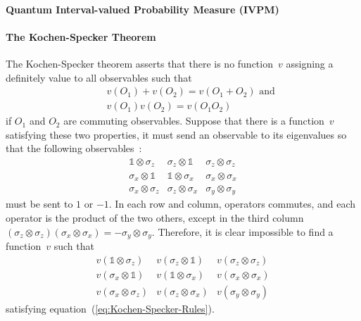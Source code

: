 \documentclass[reprint, aps, prl,superscriptaddress, showpacs,
showkeys]{revtex4-1}
\theoremstyle{plain}
\theoremstyle{definition}
\begin{document}
\paragraph{Quantum Interval-valued Probability Measure (IVPM)}

\paragraph{The Kochen-Specker Theorem}

The Kochen-Specker theorem asserts that there is no function~$v$
assigning a definitely value to all observables such that 
\begin{eqnarray}
 &  & v\left(O_{1}\right)+v\left(O_{2}\right)=v\left(O_{1}+O_{2}\right)\textrm{ and}\\
 &  & v\left(O_{1}\right)v\left(O_{2}\right)=v\left(O_{1}O_{2}\right)\label{eq:Kochen-Specker-Rules}
\end{eqnarray}
if $O_{1}$ and $O_{2}$ are commuting observables. Suppose that there
is a function~$v$ satisfying these two properties, it must send
an observable to its eigenvalues so that the following observables~\citep{Mermin1990Simple,peres1995quantum}:
\begin{equation}
\begin{array}{ccc}
\mathbb{1}\otimes\sigma_{z} & \sigma_{z}\otimes\mathbb{1} & \sigma_{z}\otimes\sigma_{z}\\
\sigma_{x}\otimes\mathbb{1} & \mathbb{1}\otimes\sigma_{x} & \sigma_{x}\otimes\sigma_{x}\\
\sigma_{x}\otimes\sigma_{z} & \sigma_{z}\otimes\sigma_{x} & \sigma_{y}\otimes\sigma_{y}
\end{array}\label{eq:MerminSquare}
\end{equation}
must be sent to $1$ or $-1$. In each row and column, operators commutes,
and each operator is the product of the two others, except in the
third column $\left(\sigma_{z}\otimes\sigma_{z}\right)\left(\sigma_{x}\otimes\sigma_{x}\right)=-\sigma_{y}\otimes\sigma_{y}$.
Therefore, it is clear impossible to find a function~$v$ such that
\begin{equation}
\begin{array}{ccc}
v\left(\mathbb{1}\otimes\sigma_{z}\right) & v\left(\sigma_{z}\otimes\mathbb{1}\right) & v\left(\sigma_{z}\otimes\sigma_{z}\right)\\
v\left(\sigma_{x}\otimes\mathbb{1}\right) & v\left(\mathbb{1}\otimes\sigma_{x}\right) & v\left(\sigma_{x}\otimes\sigma_{x}\right)\\
v\left(\sigma_{x}\otimes\sigma_{z}\right) & v\left(\sigma_{z}\otimes\sigma_{x}\right) & v\left(\sigma_{y}\otimes\sigma_{y}\right)
\end{array}\label{eq:MerminSquare-values}
\end{equation}
satisfying equation~(\ref{eq:Kochen-Specker-Rules}).
\end{document}
